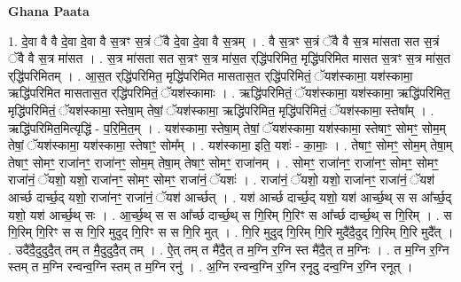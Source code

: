 \documentclass[17pt]{extarticle}
\begin{document}
\textbf{Ghana Paata } \newline

1. दे॒वा वै वै दे॒वा दे॒वा वै स॒त्रꣳ स॒त्रं ॅवै दे॒वा दे॒वा वै स॒त्रम् । . वै स॒त्रꣳ स॒त्रं ॅवै वै स॒त्र मा॑सता सत स॒त्रं ॅवै वै स॒त्र मा॑सत । . स॒त्र मा॑सता सत स॒त्रꣳ स॒त्र मा॑स॒त र्‌द्धि॑परिमित॒ मृद्धि॑परिमित मासत स॒त्रꣳ स॒त्र मा॑स॒त र्‌द्धि॑परिमितम् । . आ॒स॒त र्‌द्धि॑परिमित॒ मृद्धि॑परिमित मासतास॒त र्‌द्धि॑परिमितं॒ ॅयश॑स्कामा॒ यश॑स्कामा॒ ऋद्धि॑परिमित मासतास॒त र्‌द्धि॑परिमितं॒ ॅयश॑स्कामाः । . ऋद्धि॑परिमितं॒ ॅयश॑स्कामा॒ यश॑स्कामा॒ ऋद्धि॑परिमित॒ मृद्धि॑परिमितं॒ ॅयश॑स्कामा॒ स्तेषा॒म् तेषां॒ ॅयश॑स्कामा॒ ऋद्धि॑परिमित॒ मृद्धि॑परिमितं॒ ॅयश॑स्कामा॒ स्तेषा᳚म् । . ऋद्धि॑परिमित॒मित्यृद्धि॑ - प॒रि॒मि॒त॒म् । . यश॑स्कामा॒ स्तेषा॒म् तेषां॒ ॅयश॑स्कामा॒ यश॑स्कामा॒ स्तेषाꣳ॒॒ सोमꣳ॒॒ सोम॒म् तेषां॒ ॅयश॑स्कामा॒ यश॑स्कामा॒ स्तेषाꣳ॒॒ सोम᳚म् । . यश॑स्कामा॒ इति॒ यशः॑ - का॒माः॒ । . तेषाꣳ॒॒ सोमꣳ॒॒ सोम॒म् तेषा॒म् तेषाꣳ॒॒ सोमꣳ॒॒ राजा॑नꣳ॒॒ राजा॑नꣳ॒॒ सोम॒म् तेषा॒म् तेषाꣳ॒॒ सोमꣳ॒॒ राजा॑नम् । . सोमꣳ॒॒ राजा॑नꣳ॒॒ राजा॑नꣳ॒॒ सोमꣳ॒॒ सोमꣳ॒॒ राजा॑नं॒ ॅयशो॒ यशो॒ राजा॑नꣳ॒॒ सोमꣳ॒॒ 
सोमꣳ॒॒ राजा॑नं॒ ॅयशः॑ । . राजा॑नं॒ ॅयशो॒ यशो॒ राजा॑नꣳ॒॒ राजा॑नं॒ ॅयश॑ आर्च्छ दार्च्छ॒द् यशो॒ राजा॑नꣳ॒॒ राजा॑नं॒ ॅयश॑ आर्च्छत् । . यश॑ आर्च्छ दार्च्छ॒द् यशो॒ यश॑ आर्च्छ॒थ् स स आ᳚र्च्छ॒द् यशो॒ यश॑ आर्च्छ॒थ् सः । . आ॒र्च्छ॒थ् स स आ᳚र्च्छ दार्च्छ॒थ् स गि॒रिम् गि॒रिꣳ स आ᳚र्च्छ दार्च्छ॒थ् स गि॒रिम् । . स गि॒रिम् गि॒रिꣳ स स गि॒रि मुदुद् गि॒रिꣳ स स गि॒रि मुत् । . गि॒रि मुदुद् गि॒रिम् गि॒रि मुदै॑दै॒दुद् गि॒रिम् गि॒रि मुदै᳚त् । . उदै॑दै॒दुदुदै॒त् तम् त मै॒दुदुदै॒त् तम् । . ऐ॒त् तम् त मै॑दै॒त् त म॒ग्नि र॒ग्नि स्त मै॑दै॒त् त म॒ग्निः । . त म॒ग्नि र॒ग्नि स्तम् त म॒ग्नि रन्वन्व॒ग्नि स्तम् त म॒ग्नि रनु॑ । . अ॒ग्नि रन्वन्व॒ग्नि र॒ग्नि रनूदु दन्व॒ग्नि र॒ग्नि रनूत् । \newline
\end{document}
